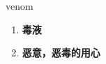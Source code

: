 
\begin{frame}
{\huge venom}
\begin{center}
\begin{enumerate}\Large
  \item \textbf{毒液}
  \item \textbf{恶意，恶毒的用心}
\end{enumerate}
\end{center}
\end{frame}
